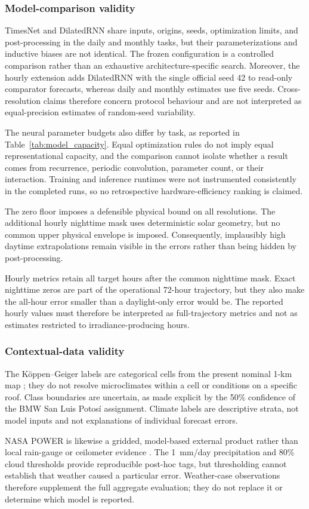 \subsubsection{Model-comparison validity}

TimesNet and DilatedRNN share inputs, origins, seeds, optimization limits, and
post-processing in the daily and monthly tasks, but their parameterizations and
inductive biases are not identical. The frozen configuration is a controlled
comparison rather than an exhaustive architecture-specific search. Moreover,
the hourly extension adds DilatedRNN with the single official seed 42 to
read-only comparator forecasts, whereas daily and monthly estimates use five
seeds. Cross-resolution claims therefore concern protocol behaviour and are
not interpreted as equal-precision estimates of random-seed variability.

The neural parameter budgets also differ by task, as reported in
Table~\ref{tab:model_capacity}. Equal optimization rules do not imply equal
representational capacity, and the comparison cannot isolate whether a result
comes from recurrence, periodic convolution, parameter count, or their
interaction. Training and inference runtimes were not instrumented consistently
in the completed runs, so no retrospective hardware-efficiency ranking is
claimed.

The zero floor imposes a defensible physical bound on all resolutions. The
additional hourly nighttime mask uses deterministic solar geometry, but no
common upper physical envelope is imposed. Consequently, implausibly high
daytime extrapolations remain visible in the errors rather than being hidden by
post-processing.

Hourly metrics retain all target hours after the common nighttime mask. Exact
nighttime zeros are part of the operational 72-hour trajectory, but they also
make the all-hour error smaller than a daylight-only error would be. The
reported hourly values must therefore be interpreted as full-trajectory
metrics and not as estimates restricted to irradiance-producing hours.

\subsubsection{Contextual-data validity}

The K\"oppen--Geiger labels are categorical cells from the present nominal
1-km map \cite{beck2018}; they do not resolve microclimates within a cell or
conditions on a specific roof. Class boundaries are uncertain, as made explicit
by the 50\% confidence of the BMW San Luis Potos\'i assignment. Climate labels
are descriptive strata, not model inputs and not explanations of individual
forecast errors.

NASA POWER is likewise a gridded, model-based external product rather than
local rain-gauge or ceilometer evidence \cite{nasapowerdaily}. The 1~mm/day
precipitation and 80\% cloud thresholds provide reproducible post-hoc tags, but
thresholding cannot establish that weather caused a particular error.
Weather-case observations therefore supplement the full aggregate evaluation;
they do not replace it or determine which model is reported.
